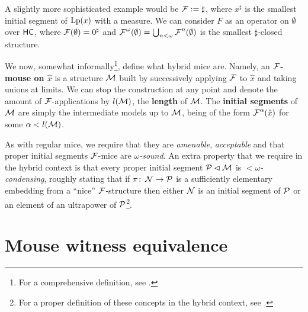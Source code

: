 \documentclass[../../main]{subfiles}
\begin{document}
\qquad A slightly more sophisticated example would be $\F := \sharp$, where $x^\sharp$ is the smallest initial segment of $\lp(x)$ with a measure. We can consider $F$ as an operator on $\emptyset$ over $\hc$, where $\F(\emptyset) = 0^\sharp$ and $\F^\omega(\emptyset) = \bigcup_{n<\omega}\F^n(\emptyset)$ is the smallest $\sharp$-closed structure.


We now, somewhat informally\footnote{For a comprehensive definition, see \cite[Section 2]{SchlutzenbergTrang}.}, define what hybrid mice are. Namely, an \textbf{$\F$-mouse on $\hat x$} is a structure $\M$ built by successively applying $\F$ to $\hat x$ and taking unions at limits. We can stop the construction at any point and denote the amount of $\F$-applications by $l(\M)$, the \textbf{length} of $\M$. The \textbf{initial segments} of $\M$ are simply the intermediate models up to $\M$, being of the form $\F^\alpha(\hat x)$ for some $\alpha<l(\M)$.

\qquad As with regular mice, we require that they are \textit{amenable}, \textit{acceptable} and that proper initial segments $\F$-mice are \textit{$\omega$-sound}. An extra property that we require in the hybrid context is that every proper initial segment $\P\pinit\M$ is \textit{${<}\omega$-condensing}, roughly stating that if $\pi\colon\N\to\P$ is a sufficiently elementary embedding from a ``nice'' $\F$-structure then either $\N$ is an initial segment of $\P$ or an element of an ultrapower of $\P$\footnote{For a proper definition of these concepts in the hybrid context, see \cite[Section 2]{SchlutzenbergTrang}.}.


\section{Mouse witness equivalence}


\end{document}
